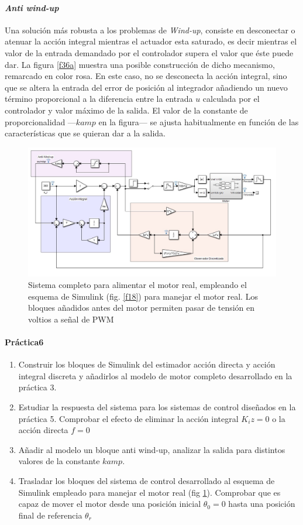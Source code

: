 \documentclass[10pt,a4paper]{report}
\begin{document}
\paragraph{\emph{Anti wind-up}}
Una solución más robusta a los problemas de \emph{Wind-up}, consiste en desconectar o atenuar la acción integral mientras el actuador esta saturado, es decir mientras el valor de la entrada demandado por el controlador supera el valor que éste puede dar. La figura \ref{f36a} muestra una posible construcción de dicho mecanismo, remarcado en color rosa. En este caso, no se desconecta la acción integral, sino que se altera la entrada del error de posición al integrador añadiendo un nuevo término proporcional a la diferencia entre la entrada $u$ calculada por el controlador y valor máximo de la salida. El valor de la constante de proporcionalidad ---$kamp$ en la figura--- se ajusta habitualmente en función de las características que se quieran dar a la salida. 

\begin{figure}
	\centering
		\includegraphics[width=\textwidth]{ctrlreal.jpg}
	\caption{Sistema completo para alimentar el motor real, empleando el esquema de Simulink (fig. \ref{f18}) para manejar el motor real. Los bloques añadidos antes del motor permiten pasar de tensión en voltios a señal de PWM}\label{f37}
\end{figure}
\paragraph{Práctica6}
\begin{enumerate}
\item  Construir los bloques de Simulink del estimador acción directa y  acción integral discreta y añadirlos al modelo de motor completo desarrollado en la práctica 3.
 \item Estudiar la respuesta del sistema para los sistemas de control diseñados en la práctica 5. Comprobar el efecto de eliminar la acción integral $K_iz=0$ o la acción directa $f=0$
 \item Añadir al modelo un bloque anti wind-up, analizar la salida para distintos valores de la constante $kamp$.
\item Trasladar los bloques del sistema de control desarrollado al esquema de Simulink empleado para manejar el motor real (fig \ref{f37}). Comprobar que es capaz de mover el motor desde una posición inicial $\theta_0 = 0$ hasta una posición final de referencia $\theta_r$
\end{enumerate}



{}
\end{document}
